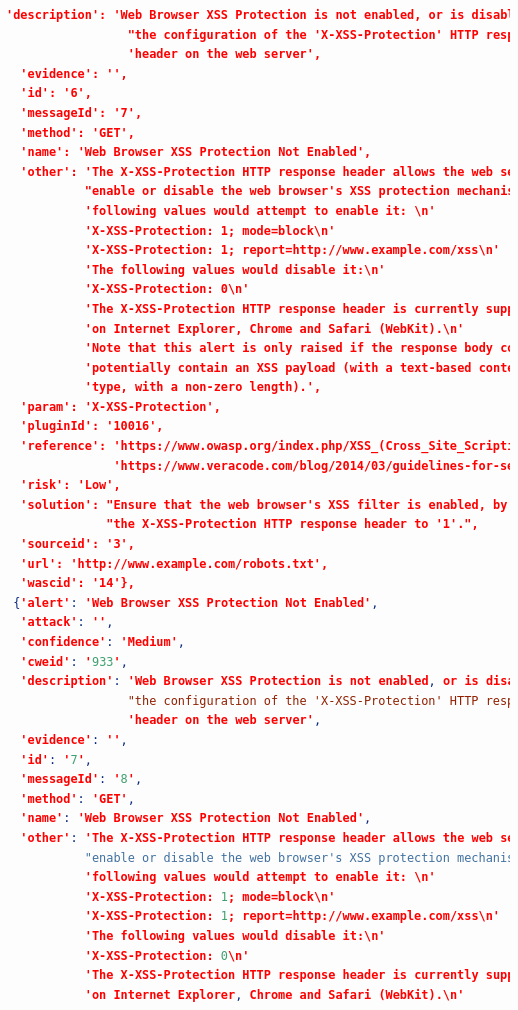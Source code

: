 \begin{lstlisting}[language=json,label={lst:owas_zap_welcome_message_alerts},caption={Alerts showed with NGINX default configuration}]
  'description': 'Web Browser XSS Protection is not enabled, or is disabled by '
                 "the configuration of the 'X-XSS-Protection' HTTP response "
                 'header on the web server',
  'evidence': '',
  'id': '6',
  'messageId': '7',
  'method': 'GET',
  'name': 'Web Browser XSS Protection Not Enabled',
  'other': 'The X-XSS-Protection HTTP response header allows the web server to '
           "enable or disable the web browser's XSS protection mechanism. The "
           'following values would attempt to enable it: \n'
           'X-XSS-Protection: 1; mode=block\n'
           'X-XSS-Protection: 1; report=http://www.example.com/xss\n'
           'The following values would disable it:\n'
           'X-XSS-Protection: 0\n'
           'The X-XSS-Protection HTTP response header is currently supported '
           'on Internet Explorer, Chrome and Safari (WebKit).\n'
           'Note that this alert is only raised if the response body could '
           'potentially contain an XSS payload (with a text-based content '
           'type, with a non-zero length).',
  'param': 'X-XSS-Protection',
  'pluginId': '10016',
  'reference': 'https://www.owasp.org/index.php/XSS_(Cross_Site_Scripting)_Prevention_Cheat_Sheet\n'
               'https://www.veracode.com/blog/2014/03/guidelines-for-setting-security-headers/',
  'risk': 'Low',
  'solution': "Ensure that the web browser's XSS filter is enabled, by setting "
              "the X-XSS-Protection HTTP response header to '1'.",
  'sourceid': '3',
  'url': 'http://www.example.com/robots.txt',
  'wascid': '14'},
 {'alert': 'Web Browser XSS Protection Not Enabled',
  'attack': '',
  'confidence': 'Medium',
  'cweid': '933',
  'description': 'Web Browser XSS Protection is not enabled, or is disabled by '
                 "the configuration of the 'X-XSS-Protection' HTTP response "
                 'header on the web server',
  'evidence': '',
  'id': '7',
  'messageId': '8',
  'method': 'GET',
  'name': 'Web Browser XSS Protection Not Enabled',
  'other': 'The X-XSS-Protection HTTP response header allows the web server to '
           "enable or disable the web browser's XSS protection mechanism. The "
           'following values would attempt to enable it: \n'
           'X-XSS-Protection: 1; mode=block\n'
           'X-XSS-Protection: 1; report=http://www.example.com/xss\n'
           'The following values would disable it:\n'
           'X-XSS-Protection: 0\n'
           'The X-XSS-Protection HTTP response header is currently supported '
           'on Internet Explorer, Chrome and Safari (WebKit).\n'

\end{lstlisting}
